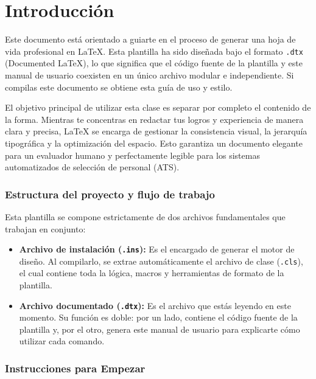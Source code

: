 \part{Introducción}

Este documento está orientado a guiarte en el proceso de generar una hoja de vida profesional en {\lmr\LaTeX}.
Esta plantilla ha sido diseñada bajo el formato \texttt{.dtx} ({\lmr Documented \LaTeX}), lo que significa que el código fuente de la plantilla y este manual de usuario coexisten en un único archivo modular e independiente.
Si compilas este documento se obtiene esta guía de uso y estilo.

El objetivo principal de utilizar esta clase es separar por completo el contenido de la forma.
Mientras te concentras en redactar tus logros y experiencia de manera clara y precisa, {\lmr\LaTeX} se encarga de gestionar la consistencia visual, la jerarquía tipográfica y la optimización del espacio.
Esto garantiza un documento elegante para un evaluador humano y perfectamente legible para los sistemas automatizados de selección de personal (ATS).



\section{Estructura del proyecto y flujo de trabajo}

Esta plantilla se compone estrictamente de dos archivos fundamentales que trabajan en conjunto:

\begin{itemize}
    \item \textbf{Archivo de instalación (\texttt{.ins}):} Es el encargado de generar el motor de diseño. Al compilarlo, se extrae automáticamente el archivo de clase (\texttt{.cls}), el cual contiene toda la lógica, macros y herramientas de formato de la plantilla.
    \item \textbf{Archivo documentado (\texttt{.dtx}):} Es el archivo que estás leyendo en este momento. Su función es doble: por un lado, contiene el código fuente de la plantilla y, por el otro, genera este manual de usuario para explicarte cómo utilizar cada comando.
\end{itemize}



\section{Instrucciones para Empezar}

